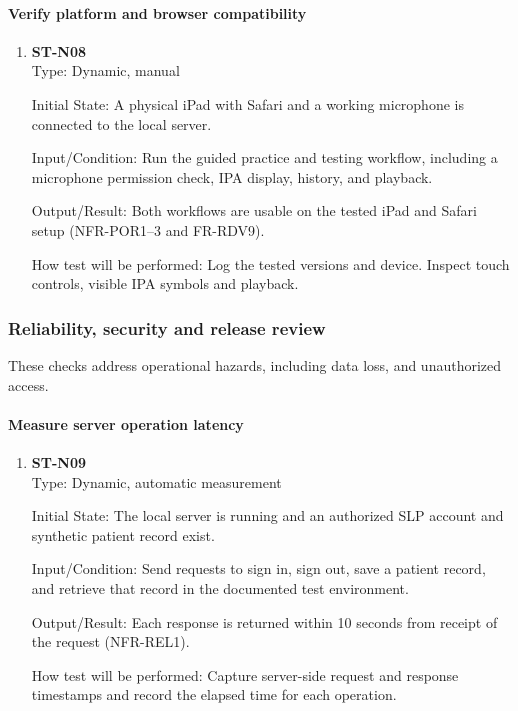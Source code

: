 \documentclass[12pt, titlepage]{article}
\newcommand{\ServerResponseLimit}{10 seconds}
\begin{document}
\paragraph{Verify platform and browser compatibility}
\begin{enumerate}
    \item \textbf{ST-N08}\\

    Type: Dynamic, manual

    Initial State: A physical iPad with Safari and a working microphone is connected to the local server.

    Input/Condition: Run the guided practice and testing workflow, including a microphone permission check, IPA display, history, and playback.

    Output/Result: Both workflows are usable on the tested iPad and Safari setup (NFR-POR1--3 and FR-RDV9).

    How test will be performed: Log the tested versions and device. Inspect touch controls, visible IPA symbols and playback.

\end{enumerate}

\subsubsection{Reliability, security and release review}

These checks address operational hazards, including data loss, and unauthorized access.

\paragraph{Measure server operation latency}
\begin{enumerate}
    \item \textbf{ST-N09}\\
    Type: Dynamic, automatic measurement

    Initial State: The local server is running and an authorized SLP account
    and synthetic patient record exist.

    Input/Condition: Send requests to sign in, sign out, save a patient record, and
    retrieve that record in the documented test environment.

    Output/Result: Each response is returned within \ServerResponseLimit{}
    from receipt of the request (NFR-REL1).

    How test will be performed: Capture server-side request and response
    timestamps and record the elapsed time for each operation.
\end{enumerate}
\end{document}
